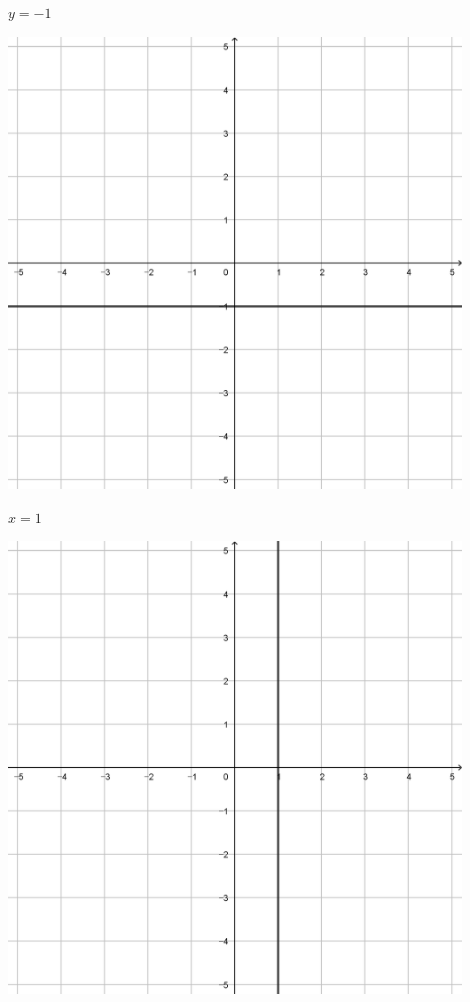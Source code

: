 \documentclass[a4paper]{oblivoir}
\begin{document}
\begin{minipage}{0.45\textwidth}\centering
\(y=-1\)
\par\bigskip\includegraphics[width=0.9\textwidth]{img/1_line_27}
\end{minipage}
\begin{minipage}{0.45\textwidth}\centering
\(x=1\)
\par\bigskip\includegraphics[width=0.9\textwidth]{img/1_line_28}
\end{minipage}\bigskip\bigskip\par
\end{document}
